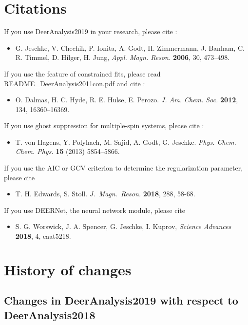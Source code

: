 \documentclass{article}
\begin{document}
\section{Citations}

If you use DeerAnalysis2019 in your research, please cite \cite{jeschke2006}:
\begin{itemize}
\item G. Jeschke, V. Chechik, P. Ionita, A. Godt, H. Zimmermann, J. Banham, C. R. Timmel, D. Hilger, H. Jung, \emph{Appl. Magn. Reson.} {\bf 2006}, 30, 473--498.
\end{itemize}

If you use the feature of constrained fits, please read {\ttfamily README\_DeerAnalysis2011con.pdf} and cite \cite{dalmas2012}:
\begin{itemize}
 \item O. Dalmas, H. C. Hyde, R. E. Hulse, E. Perozo. \emph{J. Am. Chem. Soc.} {\bf 2012}, 134, 16360--16369.
\end{itemize}

If you use ghost suppression for multiple-spin systems, please cite \cite{vonHagens2013}:
\begin{itemize}
\item T. von Hagens, Y. Polyhach, M. Sajid, A. Godt, G. Jeschke.
{\em Phys. Chem. Chem. Phys.} {\bf 15} (2013) 5854--5866.
\end{itemize}

If you use the AIC or GCV criterion to determine the regularization parameter, please cite \cite{edwards2018}
\begin{itemize}
\item
T. H. Edwards, S. Stoll.
\emph{J.~Magn.~Reson.} {\bf 2018}, 288, 58-68.
\end{itemize}

If you use DEERNet, the neural network module, please cite \cite{worswick2018}
\begin{itemize}
\item
S. G. Worswick, J. A. Spencer, G. Jeschke, I. Kuprov,
\emph{Science Advances} {\bf 2018}, 4, eaat5218.
\end{itemize}

\section{History of changes}

\subsection{Changes in DeerAnalysis2019 with respect to DeerAnalysis2018}
\label{changes_2019}
\end{document}
